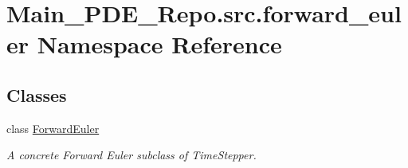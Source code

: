 \hypertarget{namespaceMain__PDE__Repo_1_1src_1_1forward__euler}{}\section{Main\+\_\+\+P\+D\+E\+\_\+\+Repo.\+src.\+forward\+\_\+euler Namespace Reference}
\label{namespaceMain__PDE__Repo_1_1src_1_1forward__euler}
\subsection*{Classes}
\begin{DoxyCompactItemize}
\item 
class \hyperlink{classMain__PDE__Repo_1_1src_1_1forward__euler_1_1ForwardEuler}{Forward\+Euler}
\begin{DoxyCompactList}\small\item\em A concrete Forward Euler subclass of Time\+Stepper. \end{DoxyCompactList}\end{DoxyCompactItemize}
